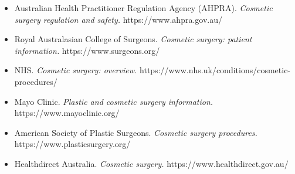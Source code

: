 \begin{itemize}
    \item Australian Health Practitioner Regulation Agency (AHPRA). \textit{Cosmetic surgery regulation and safety.} https://www.ahpra.gov.au/
    \item Royal Australasian College of Surgeons. \textit{Cosmetic surgery: patient information.} https://www.surgeons.org/
    \item NHS. \textit{Cosmetic surgery: overview.} https://www.nhs.uk/conditions/cosmetic-procedures/
    \item Mayo Clinic. \textit{Plastic and cosmetic surgery information.} https://www.mayoclinic.org/
    \item American Society of Plastic Surgeons. \textit{Cosmetic surgery procedures.} https://www.plasticsurgery.org/
    \item Healthdirect Australia. \textit{Cosmetic surgery.} https://www.healthdirect.gov.au/
\end{itemize}

